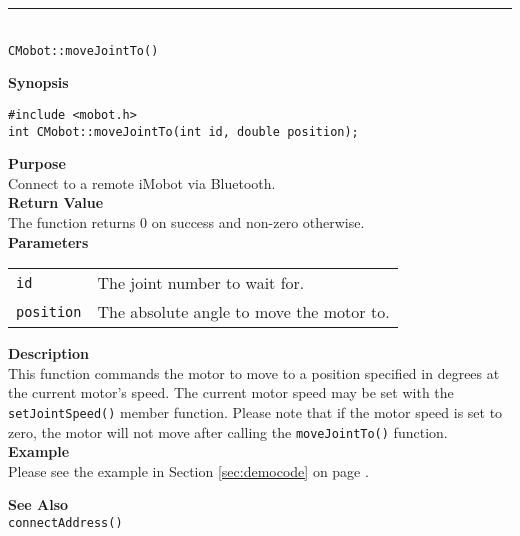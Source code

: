 \noindent
\vspace{5pt}
\rule{4.5in}{0.015in}\\
\noindent
{\LARGE \texttt{CMobot::moveJointTo()}}\\
{}

\noindent
{\bf Synopsis}\\
\begin{verbatim}
#include <mobot.h>
int CMobot::moveJointTo(int id, double position);
\end{verbatim}

\noindent
{\bf Purpose}\\
Connect to a remote iMobot via Bluetooth.\\

\noindent
{\bf Return Value}\\
The function returns 0 on success and non-zero otherwise.\\

\noindent
{\bf Parameters}\\
\vspace{-0.1in}
\begin{description}
\item               
\begin{tabular}{p{10 mm}p{145 mm}}
\texttt{id} & The joint number to wait for. \\
\texttt{position} & The absolute angle to move the motor to.  \\
\end{tabular}
\end{description}

\noindent
{\bf Description}\\
This function commands the motor to move to a position specified in degrees at
the current motor's speed. The current motor speed may be set with the
\texttt{setJointSpeed()} member function. Please note that if the motor speed
is set to zero, the motor will not move after calling the
\texttt{moveJointTo()} function. \\

\noindent
{\bf Example}\\
Please see the example in Section \ref{sec:democode} on page \pageref{sec:democode}.\\
\noindent

\noindent
{\bf See Also}\\
\texttt{connectAddress()}

